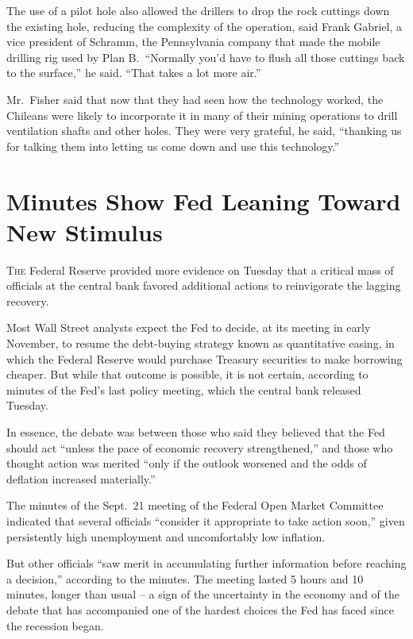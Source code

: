﻿\documentclass[12pt]{article}
\begin{document}
The use of a pilot hole also allowed the drillers to drop the rock cuttings down the existing hole,
reducing the complexity of the operation, said Frank Gabriel, a vice president of Schramm, the
Pennsylvania company that made the mobile drilling rig used by Plan B.~``Normally you'd have to
flush all those cuttings back to the surface,'' he said. ``That takes a lot more air.''

Mr.~Fisher said that now that they had seen how the technology worked, the Chileans were likely to
incorporate it in many of their mining operations to drill ventilation shafts and other holes. They
were very grateful, he said, ``thanking us for talking them into letting us come down and use this
technology.''

\section{Minutes Show Fed Leaning Toward New Stimulus}

\lettrine{T}{he} Federal Reserve provided more evidence on Tuesday that a
critical mass of officials at the central bank favored additional actions to reinvigorate the
lagging recovery.

Most Wall Street analysts expect the Fed to decide, at its meeting in early November, to resume the
debt-buying strategy known as quantitative easing, in which the Federal Reserve would purchase
Treasury securities to make borrowing cheaper. But while that outcome is possible, it is not
certain, according to minutes of the Fed's last policy meeting, which the central bank released
Tuesday.

In essence, the debate was between those who said they believed that the Fed should act ``unless the
pace of economic recovery strengthened,'' and those who thought action was merited ``only if the
outlook worsened and the odds of deflation increased materially.''

The minutes of the Sept.~21 meeting of the Federal Open Market Committee indicated that several
officials ``consider it appropriate to take action soon,'' given persistently high unemployment and
uncomfortably low inflation.

But other officials ``saw merit in accumulating further information before reaching a decision,''
according to the minutes. The meeting lasted 5 hours and 10 minutes, longer than usual -- a sign of
the uncertainty in the economy and of the debate that has accompanied one of the hardest choices the
Fed has faced since the recession began.
\end{document}
